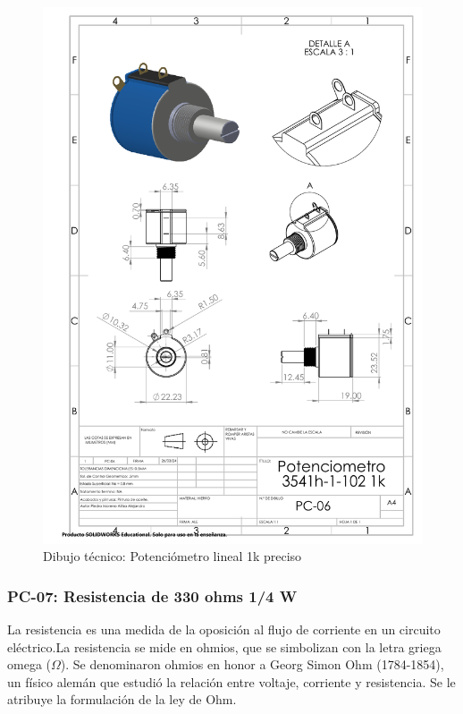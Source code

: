     \begin{figure}[H]
        \centering
        \includegraphics[trim = {7mm 1mm 1mm 1mm},clip,scale=0.4]{22/Img/potenciometroDibujo.PDF}
        \caption{Dibujo técnico: Potenciómetro lineal 1k preciso}
        \label{fig:potenciometro}
    \end{figure}
    
    
    \subsubsection{PC-07: Resistencia de 330 ohms 1/4 W }
    La resistencia es una medida de la oposición al flujo de corriente en un circuito eléctrico.La resistencia se mide en ohmios, que se simbolizan con la letra griega omega ($\Omega$). Se denominaron ohmios en honor a Georg Simon Ohm (1784-1854), un físico alemán que estudió la relación entre voltaje, corriente y resistencia. Se le atribuye la formulación de la ley de Ohm.
    
